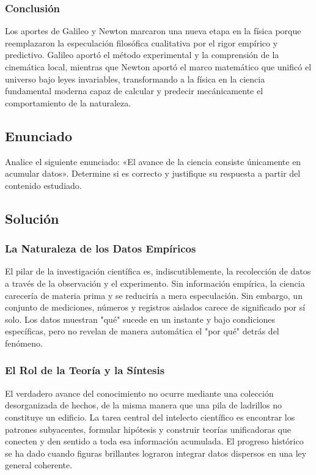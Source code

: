 \documentclass[12pt, a4paper]{article}
\begin{document}
\subsubsection*{Conclusión}
Los aportes de Galileo y Newton marcaron una nueva etapa en la física porque reemplazaron la especulación filosófica cualitativa por el rigor empírico y predictivo. Galileo aportó el método experimental y la comprensión de la cinemática local, mientras que Newton aportó el marco matemático que unificó el universo bajo leyes invariables, transformando a la física en la ciencia fundamental moderna capaz de calcular y predecir mecánicamente el comportamiento de la naturaleza.

\newpage

\subsection*{Enunciado}
Analice el siguiente enunciado: «El avance de la ciencia consiste únicamente en acumular datos». Determine si es correcto y justifique su respuesta a partir del contenido estudiado.

\subsection*{Solución}

\subsubsection*{La Naturaleza de los Datos Empíricos}
El pilar de la investigación científica es, indiscutiblemente, la recolección de datos a través de la observación y el experimento. Sin información empírica, la ciencia carecería de materia prima y se reduciría a mera especulación. Sin embargo, un conjunto de mediciones, números y registros aislados carece de significado por sí solo. Los datos muestran "qué" sucede en un instante y bajo condiciones específicas, pero no revelan de manera automática el "por qué" detrás del fenómeno.

\subsubsection*{El Rol de la Teoría y la Síntesis}
El verdadero avance del conocimiento no ocurre mediante una colección desorganizada de hechos, de la misma manera que una pila de ladrillos no constituye un edificio. La tarea central del intelecto científico es encontrar los patrones subyacentes, formular hipótesis y construir teorías unificadoras que conecten y den sentido a toda esa información acumulada. El progreso histórico se ha dado cuando figuras brillantes lograron integrar datos dispersos en una ley general coherente.
\end{document}
